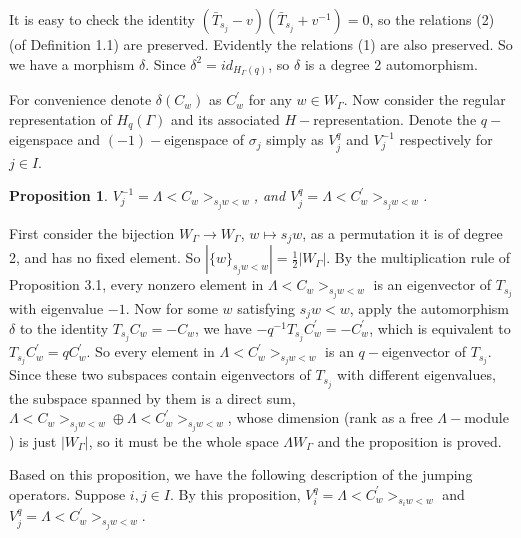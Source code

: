 \def\CTEXPreproc{Created by ctex v0.2.12, don't edit!}\documentclass[11pt]{article}
\newtheorem{prop}{Proposition}[section]
\begin{document}
   \begin{pf}
   It is easy to check the identity $(  \bar{T}_{s_j } -v   )(\bar{T}_{s_j} + v^{-1}  )=0  $, so the relations (2) (of Definition 1.1) are preserved. Evidently the relations (1) are also preserved. So we have a morphism $\delta$. Since $\delta ^2 = id _{H_{\Gamma}(q)}$, so $\delta$ is a degree 2 automorphism.  \\

   \end{pf}

    For convenience  denote $\delta ( C_w)  $ as $C^{'} _w $ for any $w\in W_{\Gamma}$. Now consider the regular representation of $H_q (\Gamma)$ and its associated $H-$representation. Denote the $q-$eigenspace and $(-1)-$eigenspace of $\sigma_j$ simply as $V_j ^q $ and $V_j ^{-1}$ respectively for $j\in I$.

    \begin{prop}
     $V_j ^{-1} = \Lambda < C_w   >_{s_j w<w  }  $, and $V_j ^{q} = \Lambda <   C^{'} _w    >_{s_j w <w }$.

       \end{prop}

    \begin{pf}
    First consider the bijection $W_{\Gamma} \rightarrow W_{\Gamma}$, $w\mapsto s_j w  $, as a permutation it is of degree 2, and has no fixed element. So  $| \{ w \} _{s_j w<w }  | =\frac{1}{2} | W_{\Gamma} | $. By the multiplication rule of Proposition 3.1, every nonzero element in
    $\Lambda < C_w >_{s_j w<w} $ is an eigenvector of $T_{s_j}$ with eigenvalue $-1$. Now for some $w$ satisfying $s_j w<w$,  apply the automorphism $\delta$ to the identity
     $ T_{s_j} C_w = -C_w $,  we have $ -q^{-1}T_{s_j } C^{'} _w  = - C^{'}_w  $, which is equivalent to
     $T_{s_j} C^{'} _w = q C^{'} _w  $.  So every element in $\Lambda <  C^{'} _w  >_{s_j w<w }$ is an $q-$eigenvector of
     $T_{s_j}$. Since these two subspaces contain eigenvectors of $T_{s_j}$ with different eigenvalues, the subspace spanned by them is a direct sum, $ \Lambda <  C_w > _{s_j w<w} \oplus \Lambda < C^{'}_w  >_{s_j w<w} $, whose dimension (rank as a free $\Lambda-$module ) is just
     $|W_{\Gamma}|$, so it must be the whole space $\Lambda W_{\Gamma}$ and the proposition is proved.

    \end{pf}

    Based on this proposition, we have the following description of the jumping operators. Suppose $i,j\in I$. By this proposition,
    $ V^{q} _i = \Lambda < C^{'}_w    >_{s_i w<w}$ and $V^{q} _j = \Lambda < C^{'}_w >_{s_j w<w}$.
\end{document}

